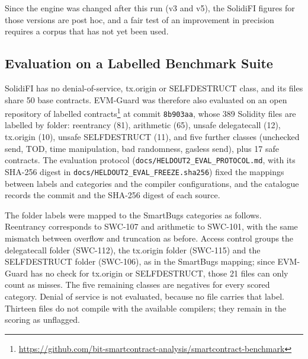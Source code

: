 \documentclass[pdflatex,sn-mathphys]{sn-jnl}
\theoremstyle{thmstyletwo}
\theoremstyle{thmstyletwo}
\begin{document}
Since the engine was changed after this run (v3 and v5), the SolidiFI figures for those versions are post hoc, and a fair test of an improvement in precision requires a corpus that has not yet been used.

\subsection{Evaluation on a Labelled Benchmark Suite}\label{sec:results:heldout2}
SolidiFI has no denial-of-service, tx.origin or SELFDESTRUCT class, and its files share 50 base contracts. EVM-Guard was therefore also evaluated on an open repository of labelled contracts\footnote{\url{https://github.com/bit-smartcontract-analysis/smartcontract-benchmark}} at commit \texttt{8b903aa}, whose 389 Solidity files are labelled by folder: reentrancy (81), arithmetic (65), unsafe delegatecall (12), tx.origin (10), unsafe SELFDESTRUCT (11), and five further classes (unchecked send, TOD, time manipulation, bad randomness, gasless send), plus 17 safe contracts. The evaluation protocol (\texttt{docs/HELDOUT2\_EVAL\_PROTOCOL.md}, with its SHA-256 digest in \texttt{docs/HELDOUT2\_EVAL\_FREEZE.sha256}) fixed the mappings between labels and categories and the compiler configurations, and the catalogue records the commit and the SHA-256 digest of each source.

The folder labels were mapped to the SmartBugs categories as follows. Reentrancy corresponds to SWC-107 and arithmetic to SWC-101, with the same mismatch between overflow and truncation as before. Access control groups the delegatecall folder (SWC-112), the tx.origin folder (SWC-115) and the SELFDESTRUCT folder (SWC-106), as in the SmartBugs mapping; since EVM-Guard has no check for tx.origin or SELFDESTRUCT, those 21 files can only count as misses. The five remaining classes are negatives for every scored category. Denial of service is not evaluated, because no file carries that label. Thirteen files do not compile with the available compilers; they remain in the scoring as unflagged.
\end{document}
